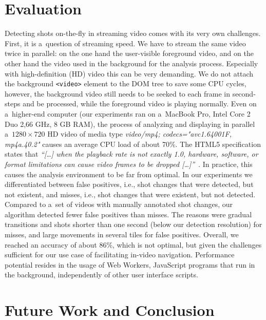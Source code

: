 \documentclass{sig-alternate}
\begin{document}
\section{Evaluation} \label{sec:evaluation}
Detecting shots on-the-fly in streaming video comes with its very own challenges. First, it is a~question of streaming speed. We have to stream the same video twice in parallel: on the one hand the user-visible foreground video, and on the other hand the video used in the background for the analysis process. Especially with high-definition (HD) video this can be very demanding. We do not attach the background \texttt{<video>} element to the DOM tree to save some CPU cycles, however, the background video still needs to be seeked to each frame in second-steps and be processed, while the foreground video is playing normally. Even on a~higher-end computer (our experiments ran on a~MacBook Pro, Intel Core 2 Duo 2,66 GHz, 8 GB RAM), the process of analyzing and displaying in parallel a~$\mathit{1280} \times \mathit{720}$ HD video of media type \emph{video/mp4; codecs="avc1.64001F, mp4a.40.2"} causes an average CPU load of about 70\%. The HTML5 specification states that \textit{``[\ldots] when the playback rate is not exactly 1.0, hardware, software, or format limitations can cause video frames to be dropped [\ldots]''}~\cite{whatwgvideo}. In practice, this causes the analysis environment to be far from optimal. In our experiments we differentiated between false positives, i.e., shot changes that were detected, but not existent, and misses, i.e., shot changes that were existent, but not detected. Compared to a~set of videos with manually annotated shot changes, our algorithm detected fewer false positives than misses. The reasons were gradual transitions and shots shorter than one second (below our detection resolution) for misses, and large movements in several tiles for false positives. Overall, we reached an accuracy of about 86\%, which is not optimal, but given the challenges sufficient for our use case of facilitating in-video navigation. 
Performance potential resides in the usage of Web Workers,
JavaScript programs that run in the background, independently of other user interface scripts.

\section{Future Work and Conclusion} \label{sec:future-work-conclusion}
\end{document}
